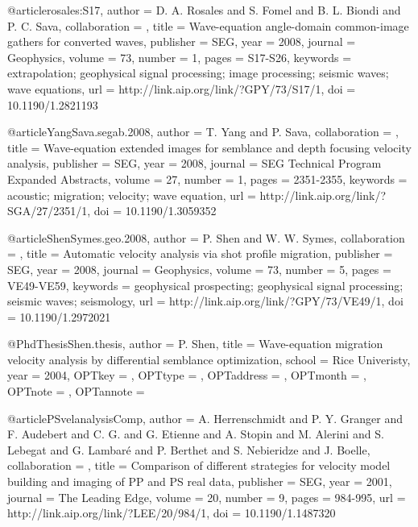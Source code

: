 @article{rosales:S17,
author = {D. A. Rosales and S. Fomel and B. L. Biondi and P. C. Sava},
collaboration = {},
title = {Wave-equation angle-domain common-image gathers for converted waves},
publisher = {SEG},
year = {2008},
journal = {Geophysics},
volume = {73},
number = {1},
pages = {S17-S26},
keywords = {extrapolation; geophysical signal processing; image processing; seismic waves; wave equations},
url = {http://link.aip.org/link/?GPY/73/S17/1},
doi = {10.1190/1.2821193}
}




@article{YangSava.segab.2008,
author = {T. Yang and P. Sava},
collaboration = {},
title = {Wave-equation extended images for semblance and depth focusing velocity analysis},
publisher = {SEG},
year = {2008},
journal = {SEG Technical Program Expanded Abstracts},
volume = {27},
number = {1},
pages = {2351-2355},
keywords = {acoustic; migration; velocity; wave equation},
url = {http://link.aip.org/link/?SGA/27/2351/1},
doi = {10.1190/1.3059352}
}



@article{ShenSymes.geo.2008,
author = {P. Shen and W. W. Symes},
collaboration = {},
title = {Automatic velocity analysis via shot profile migration},
publisher = {SEG},
year = {2008},
journal = {Geophysics},
volume = {73},
number = {5},
pages = {VE49-VE59},
keywords = {geophysical prospecting; geophysical signal processing; seismic waves; seismology},
url = {http://link.aip.org/link/?GPY/73/VE49/1},
doi = {10.1190/1.2972021}
}






@PhdThesis{Shen.thesis,
  author = 	 {P. Shen},
  title = 	 {Wave-equation migration velocity analysis by
                  differential semblance optimization},
  school = 	 {Rice Univeristy},
  year = 	 {2004},
  OPTkey = 	 {},
  OPTtype = 	 {},
  OPTaddress = 	 {},
  OPTmonth = 	 {},
  OPTnote = 	 {},
  OPTannote = 	 {}
}

@article{PSvelanalysisComp,
author = {A. Herrenschmidt and P. Y. Granger and
                  F. Audebert and C. G. and
                  G. Etienne and A. Stopin and M.
                  Alerini and S. Lebegat and G. Lambar\'{e}
                  and P. Berthet and S. Nebieridze and
                  J. Boelle},
collaboration = {},
title = {Comparison of different strategies for velocity model
                  building and imaging of {PP} and {PS} real data},
publisher = {SEG},
year = {2001},
journal = {The Leading Edge},
volume = {20},
number = {9},
pages = {984-995},
url = {http://link.aip.org/link/?LEE/20/984/1},
doi = {10.1190/1.1487320}
}









